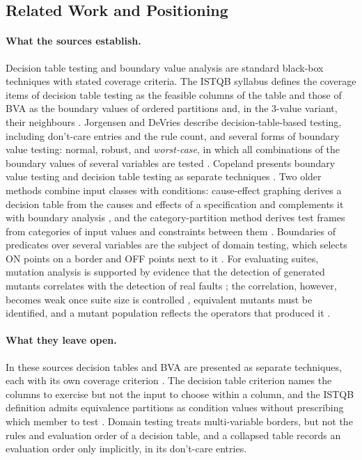 \documentclass[11pt,a4paper]{article}
\begin{document}
\subsection{Related Work and Positioning}
\label{sec:bg-related}

\paragraph{What the sources establish.} Decision table testing and boundary
value analysis are standard black-box techniques with stated coverage
criteria. The ISTQB syllabus defines the coverage items of decision table
testing as the feasible columns of the table and those of BVA as the
boundary values of ordered partitions and, in the 3-value variant, their
neighbours \cite[\S\S4.2.2--4.2.3]{istqb}. Jorgensen and DeVries describe
decision-table-based testing, including don't-care entries and the rule
count, and several forms of boundary value testing: normal, robust, and
\emph{worst-case}, in which all combinations of the boundary values of
several variables are tested \cite[Ch.~5, Ch.~7]{jorgensen2021}. Copeland
presents boundary value testing and decision table testing as separate
techniques \cite[Ch.~4, Ch.~5]{copeland2004}. Two older methods combine
input classes with conditions: cause-effect graphing derives a decision
table from the causes and effects of a specification and complements it with
boundary analysis \cite{myers2011}, and the category-partition method
derives test frames from categories of input values and constraints between
them \cite{ostrand1988}. Boundaries of predicates over
several variables are the subject of domain testing, which selects ON points
on a border and OFF points next to it \cite{whitecohen1980}
\cite[Ch.~8]{copeland2004}. For evaluating suites, mutation analysis
\cite{demillo1978,jia2011} is supported by evidence that the detection of
generated mutants correlates with the detection of real faults
\cite{andrews2005,just2014}; the correlation, however, becomes weak once
suite size is controlled \cite{papadakis2018}, equivalent mutants must be
identified, and a mutant population reflects the operators that produced it
\cite{jia2011}.

\paragraph{What they leave open.} In these sources decision tables and BVA
are presented as separate techniques, each with its own coverage criterion
\cite[\S\S4.2.2--4.2.3]{istqb} \cite[Ch.~4, Ch.~5]{copeland2004}. The decision
table criterion names the columns to exercise but not the input to choose
within a column, and the ISTQB definition admits equivalence partitions as
condition values without prescribing which member to test
\cite[\S4.2.3]{istqb}. Domain testing treats multi-variable borders, but not
the rules and evaluation order of a decision table, and a collapsed table
records an evaluation order only implicitly, in its don't-care entries.
\end{document}
